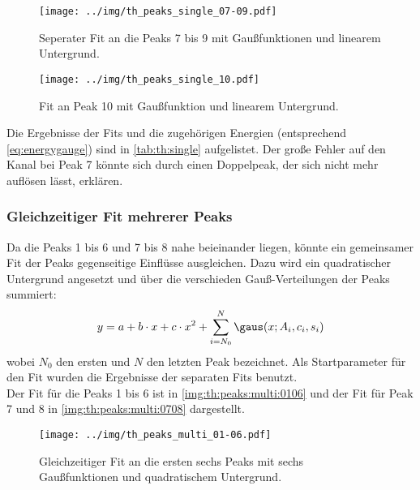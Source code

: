 \begin{figure}[H]
\begin{center}
  \texttt{[image: ../img/th\_peaks\_single\_07-09.pdf]}
  \caption{Seperater Fit an die Peaks 7 bis 9 mit Gaußfunktionen und linearem Untergrund.}
  \label{img:th:peaks:single:0709}
\end{center}
\end{figure}

\begin{figure}[H]
\begin{center}
  \texttt{[image: ../img/th\_peaks\_single\_10.pdf]}
  \caption{Fit an Peak 10 mit Gaußfunktion und linearem Untergrund.}
  \label{img:th:peaks:single:10}
\end{center}
\end{figure}

Die Ergebnisse der Fits und die zugehörigen Energien (entsprechend \autoref{eq:energygauge}) sind in \autoref{tab:th:single} aufgelistet.
Der große Fehler auf den Kanal bei Peak 7 könnte sich durch einen Doppelpeak, der sich nicht mehr auflösen lässt, erklären.


\subsubsection{Gleichzeitiger Fit mehrerer Peaks}
Da die Peaks 1 bis 6 und 7 bis 8 nahe beieinander liegen, könnte ein gemeinsamer Fit der Peaks gegenseitige Einflüsse ausgleichen.
Dazu wird ein quadratischer Untergrund angesetzt und über die verschieden Gauß-Verteilungen der Peaks summiert:
\begin{equation}
  y = a + b\cdot x + c\cdot x^2 + \sum_{i=N_0}^{N} \gaus(x; A_i, c_i, s_i)
\end{equation}
wobei $N_0$ den ersten und $N$ den letzten Peak bezeichnet. Als Startparameter für den Fit wurden die Ergebnisse der separaten Fits benutzt.\\
Der Fit für die Peaks 1 bis 6 ist in \autoref{img:th:peaks:multi:0106} und der Fit für Peak 7 und 8 in 
\autoref{img:th:peaks:multi:0708} dargestellt.
\begin{figure}[H]
\begin{center}
  \texttt{[image: ../img/th\_peaks\_multi\_01-06.pdf]}
  \caption{Gleichzeitiger Fit an die ersten sechs Peaks mit sechs Gaußfunktionen und quadratischem Untergrund.}
  \label{img:th:peaks:multi:0106}
\end{center}
\end{figure}


